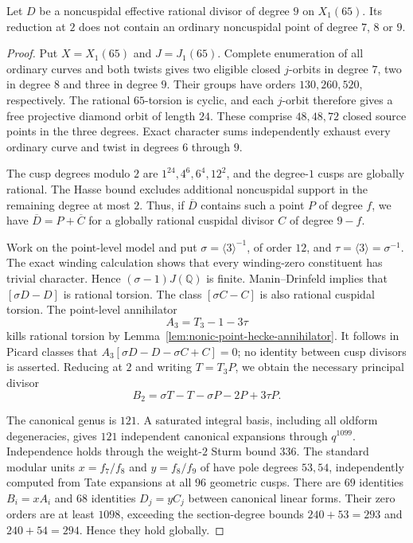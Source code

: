 \begin{proposition}\label{prop:nonic65-ordinary-reduction}
Let $D$ be a noncuspidal effective rational divisor of degree $9$ on $X_1(65)$. Its reduction at $2$ does not contain an ordinary noncuspidal point of degree $7$, $8$ or $9$.
\end{proposition}
\begin{proof}
Put $X=X_1(65)$ and $J=J_1(65)$. Complete enumeration of all ordinary curves and both twists gives two eligible closed $j$-orbits in degree $7$, two in degree $8$ and three in degree $9$. Their groups have orders $130,260,520$, respectively. The rational $65$-torsion is cyclic, and each $j$-orbit therefore gives a free projective diamond orbit of length $24$. These comprise $48,48,72$ closed source points in the three degrees. Exact character sums independently exhaust every ordinary curve and twist in degrees $6$ through $9$.

The cusp degrees modulo $2$ are $1^{24},4^6,6^4,12^2$, and the degree-$1$ cusps are globally rational. The Hasse bound excludes additional noncuspidal support in the remaining degree at most $2$. Thus, if $\overline D$ contains such a point $P$ of degree $f$, we have $\overline D=P+\overline C$ for a globally rational cuspidal divisor $C$ of degree $9-f$.

Work on the point-level model and put $\sigma=\langle3\rangle^{-1}$, of order $12$, and $\tau=\langle3\rangle=\sigma^{-1}$. The exact winding calculation shows that every winding-zero constituent has trivial character. Hence $(\sigma-1)J(\mathbb Q)$ is finite. Manin--Drinfeld implies that $[\sigma D-D]$ is rational torsion. The class $[\sigma C-C]$ is also rational cuspidal torsion. The point-level annihilator
\[
 A_3=T_3-1-3\tau
\]
kills rational torsion by Lemma~\ref{lem:nonic-point-hecke-annihilator}. It follows in Picard classes that $A_3[\sigma D-D-\sigma C+C]=0$; no identity between cusp divisors is asserted. Reducing at $2$ and writing $T=T_3P$, we obtain the necessary principal divisor
\[
 B_2=\sigma T-T-\sigma P-2P+3\tau P.
\]

The canonical genus is $121$. A saturated integral basis, including all oldform degeneracies, gives $121$ independent canonical expansions through $q^{1099}$. Independence holds through the weight-$2$ Sturm bound $336$. The standard modular units $x=f_7/f_8$ and $y=f_8/f_9$ of \cite[Sections~2 and~2.1]{DvH} have pole degrees $53,54$, independently computed from Tate expansions at all $96$ geometric cusps. There are $69$ identities $B_i=xA_i$ and $68$ identities $D_j=yC_j$ between canonical linear forms. Their zero orders are at least $1098$, exceeding the section-degree bounds $240+53=293$ and $240+54=294$. Hence they hold globally.


\end{proof}
